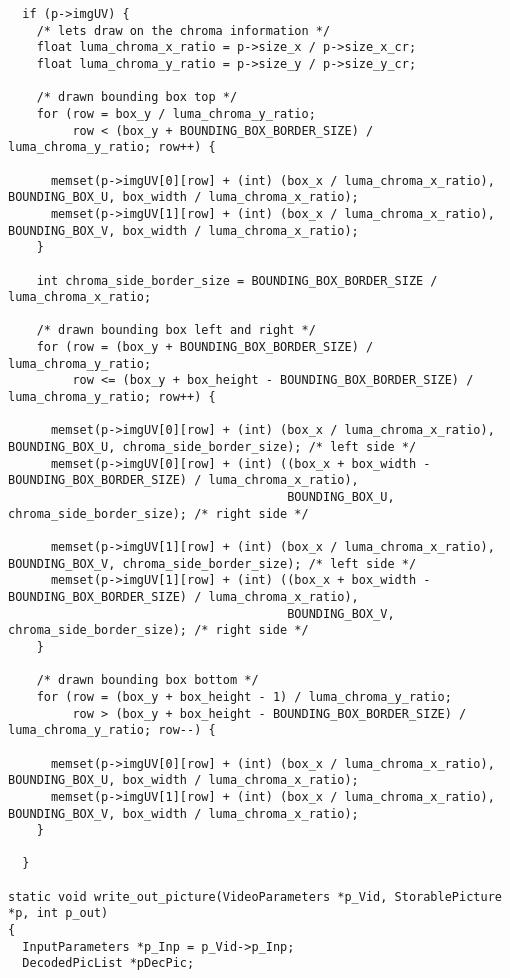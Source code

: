 \begin{lstlisting}
  if (p->imgUV) {
    /* lets draw on the chroma information */
    float luma_chroma_x_ratio = p->size_x / p->size_x_cr;
    float luma_chroma_y_ratio = p->size_y / p->size_y_cr;

    /* drawn bounding box top */
    for (row = box_y / luma_chroma_y_ratio;
         row < (box_y + BOUNDING_BOX_BORDER_SIZE) / luma_chroma_y_ratio; row++) {

      memset(p->imgUV[0][row] + (int) (box_x / luma_chroma_x_ratio), BOUNDING_BOX_U, box_width / luma_chroma_x_ratio);
      memset(p->imgUV[1][row] + (int) (box_x / luma_chroma_x_ratio), BOUNDING_BOX_V, box_width / luma_chroma_x_ratio);
    }

    int chroma_side_border_size = BOUNDING_BOX_BORDER_SIZE / luma_chroma_x_ratio;

    /* drawn bounding box left and right */
    for (row = (box_y + BOUNDING_BOX_BORDER_SIZE) / luma_chroma_y_ratio; 
         row <= (box_y + box_height - BOUNDING_BOX_BORDER_SIZE) / luma_chroma_y_ratio; row++) {

      memset(p->imgUV[0][row] + (int) (box_x / luma_chroma_x_ratio), BOUNDING_BOX_U, chroma_side_border_size); /* left side */
      memset(p->imgUV[0][row] + (int) ((box_x + box_width - BOUNDING_BOX_BORDER_SIZE) / luma_chroma_x_ratio), 
                                       BOUNDING_BOX_U, chroma_side_border_size); /* right side */

      memset(p->imgUV[1][row] + (int) (box_x / luma_chroma_x_ratio), BOUNDING_BOX_V, chroma_side_border_size); /* left side */
      memset(p->imgUV[1][row] + (int) ((box_x + box_width - BOUNDING_BOX_BORDER_SIZE) / luma_chroma_x_ratio), 
                                       BOUNDING_BOX_V, chroma_side_border_size); /* right side */
    }

    /* drawn bounding box bottom */
    for (row = (box_y + box_height - 1) / luma_chroma_y_ratio; 
         row > (box_y + box_height - BOUNDING_BOX_BORDER_SIZE) / luma_chroma_y_ratio; row--) {

      memset(p->imgUV[0][row] + (int) (box_x / luma_chroma_x_ratio), BOUNDING_BOX_U, box_width / luma_chroma_x_ratio);
      memset(p->imgUV[1][row] + (int) (box_x / luma_chroma_x_ratio), BOUNDING_BOX_V, box_width / luma_chroma_x_ratio);
    }

  }

static void write_out_picture(VideoParameters *p_Vid, StorablePicture *p, int p_out)
{
  InputParameters *p_Inp = p_Vid->p_Inp;
  DecodedPicList *pDecPic;


\end{lstlisting}
